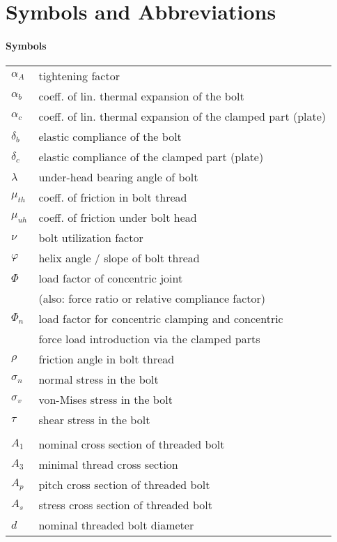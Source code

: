 \chapter*{Symbols and Abbreviations}

\subsubsection*{Symbols}
\begin{longtable}{p{4cm} l}
  $\alpha_A$ & tightening factor \\
  $\alpha_b$ & coeff. of lin. thermal expansion of the bolt \\
  $\alpha_c$ & coeff. of lin. thermal expansion of the clamped part (plate) \\
  $\delta_b$ & elastic compliance of the bolt \\
  $\delta_c$ & elastic compliance of the clamped part (plate) \\
  $\lambda$ & under-head bearing angle of bolt \\
  $\mu_{th}$ & coeff. of friction in bolt thread \\
  $\mu_{uh}$ & coeff. of friction under bolt head \\
  $\nu$ & bolt utilization factor \\
  $\varphi$ & helix angle / slope of bolt thread \\
  $\Phi$ & load factor of concentric joint \\
         & (also: force ratio or relative compliance factor) \\
  $\Phi_n$ & load factor for concentric clamping and concentric \\
           & force load introduction via the clamped parts \\
  $\rho$ & friction angle in bolt thread \\
  $\sigma_n$ & normal stress in the bolt \\
  $\sigma_v$ & von-Mises stress in the bolt \\
  $\tau$ & shear stress in the bolt \\
  & \\
  $A_1$ & nominal cross section of threaded bolt \\
  $A_3$ & minimal thread cross section \\
  $A_p$ & pitch cross section of threaded bolt \\
  $A_s$ & stress cross section of threaded bolt \\
  $d$ & nominal threaded bolt diameter \\

\end{longtable}

